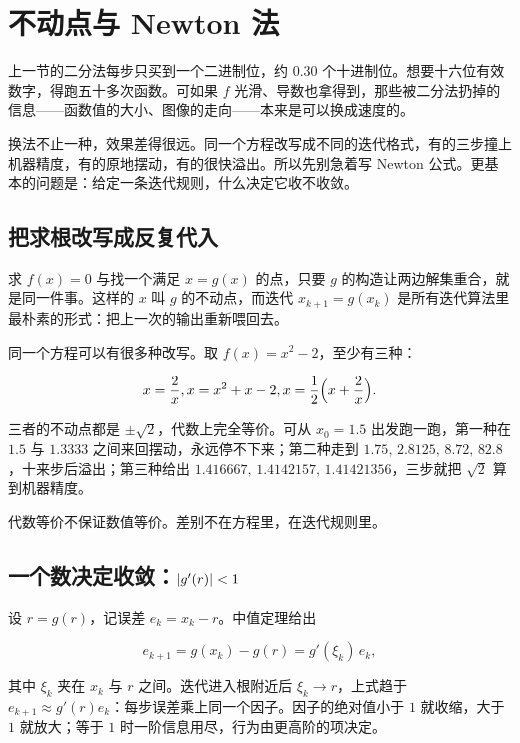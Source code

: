 \section{不动点与 Newton 法}
\label{sec:08-Numerical-Analysis/02-Root-Finding/02}

上一节的二分法每步只买到一个二进制位，约 \(0.30\) 个十进制位。想要十六位有效数字，得跑五十多次函数。可如果 \(f\) 光滑、导数也拿得到，那些被二分法扔掉的信息——函数值的大小、图像的走向——本来是可以换成速度的。

换法不止一种，效果差得很远。同一个方程改写成不同的迭代格式，有的三步撞上机器精度，有的原地摆动，有的很快溢出。所以先别急着写 Newton 公式。更基本的问题是：给定一条迭代规则，什么决定它收不收敛。

\subsection{把求根改写成反复代入}

求 \(f(x)=0\) 与找一个满足 \(x=g(x)\) 的点，只要 \(g\) 的构造让两边解集重合，就是同一件事。这样的 \(x\) 叫 \(g\) 的不动点，而迭代 \(x_{k+1}=g(x_k)\) 是所有迭代算法里最朴素的形式：把上一次的输出重新喂回去。

同一个方程可以有很多种改写。取 \(f(x)=x^2-2\)，至少有三种：

\[
x=\frac{2}{x},\qquad x=x^2+x-2,\qquad x=\frac12\Bigl(x+\frac{2}{x}\Bigr).
\]

三者的不动点都是 \(\pm\sqrt2\)，代数上完全等价。可从 \(x_0=1.5\) 出发跑一跑，第一种在 \(1.5\) 与 \(1.3333\) 之间来回摆动，永远停不下来；第二种走到 \(1.75,\,2.8125,\,8.72,\,82.8\)，十来步后溢出；第三种给出 \(1.416667,\,1.4142157,\,1.41421356\)，三步就把 \(\sqrt2\) 算到机器精度。

代数等价不保证数值等价。差别不在方程里，在迭代规则里。

\subsection{一个数决定收敛：\texorpdfstring{\(\abs{g'(r)}<1\)}{|g'(r)|<1}}

设 \(r=g(r)\)，记误差 \(e_k=x_k-r\)。中值定理给出

\[
e_{k+1}=g(x_k)-g(r)=g'(\xi_k)\,e_k,
\]

其中 \(\xi_k\) 夹在 \(x_k\) 与 \(r\) 之间。迭代进入根附近后 \(\xi_k\to r\)，上式趋于 \(e_{k+1}\approx g'(r)e_k\)：每步误差乘上同一个因子。因子的绝对值小于 \(1\) 就收缩，大于 \(1\) 就放大；等于 \(1\) 时一阶信息用尽，行为由更高阶的项决定。

